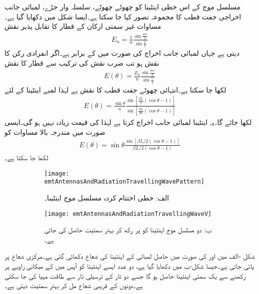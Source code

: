 مسلسل موج کے اس خطی اینٹینا کو چھوٹے چھوٹے، سلسلہ وار جڑے، لمبائی جانب اخراجی جفت قطب کا مجموعہ تصور کیا جا سکتا ہے۔ایسا شکل میں دکھایا گیا ہے۔مساوات  غیر سمتی ارکان کے قطار کا تقابل پذیر نقش 
\begin{align*}
E_n=\frac{1}{n}\frac{\sin \frac{n\psi}{2}}{\sin \frac{\psi}{2}}
\end{align*}
دیتی ہے جہاں لمبائی جانب اخراج کی صورت میں   کے برابر ہے۔اگر انفرادی رکن کا نقش  ہو تب  ضرب نقش کی ترکیب سے قطار کا نقش
\begin{align*}
E(\theta)=\frac{E_0}{n}\frac{\sin \frac{n\psi}{2}}{\sin \frac{\psi}{2}}
\end{align*}
لکھا جا سکتا ہے۔انتہائی چھوٹے جفت قطب کا نقش  ہے لہٰذا لمبے اینٹینا  کے لئے
\begin{align}
E(\theta)=\frac{\sin \theta}{n} \frac{\sin[\frac{\beta L}{2} (\cos \theta-1)]}{\sin [\frac{\beta L}{2n} (\cos \theta-1)]}
\end{align}
لکھا جائے گا۔یہ اینٹینا لمبائی جانب اخراج کرتا ہے لہٰذا  کی قیمت زیادہ نہیں ہو گی۔ایسی صورت میں مندرجہ بالا مساوات کو
\begin{align}\label{مساوات_اینٹینا_لمبی_مسلسل_موج_اینٹینا}
E(\theta)=\sin \theta\frac{\sin[\beta L\!/\!2 (\cos \theta-1)]}{\beta L\!/\!2 (\cos \theta-1)}
\end{align}
لکھا جا سکتا ہے۔

\begin{figure}
\centering
\begin{subfigure}{0.4\textwidth}
\centering
\texttt{[image: emtAntennasAndRadiationTravellingWavePattern]}
\caption*{الف: خطی اختتام کردہ مسلسل موج اینٹینا۔}
\end{subfigure}%
\begin{subfigure}{0.4\textwidth}
\centering
\texttt{[image: emtAntennasAndRadiationTravellingWaveV]}
\caption{ب: دو مسلسل موج اینٹینا کو  پر رکھ کر بہتر سمتیت حاصل کی جاتی ہے۔}
\end{subfigure}%
\caption{}
\label{شکل_اینٹینا_مسلسل_موج_شعاع}
\end{figure}

شکل -الف میں اور  کی صورت میں حاصل  لمبائی کے اینٹینا کی شعاع دکھائی گئی ہے۔مرکزی شعاع  پر پائی جاتی ہے۔جیسا شکل-ب میں دکھایا گیا ہے، دو عدد ایسے اینٹینا کو آپس میں  کے میکانی زاویے پر رکھنے سے یک سمتی اینٹینا حاصل ہو گا جسے  دو تار کے ترسیلی تار سے طاقت مہیا کی جا سکتی ہے۔دونوں کے قریبی شعاع مل کر بہتر سمتیت دیتی ہے۔

